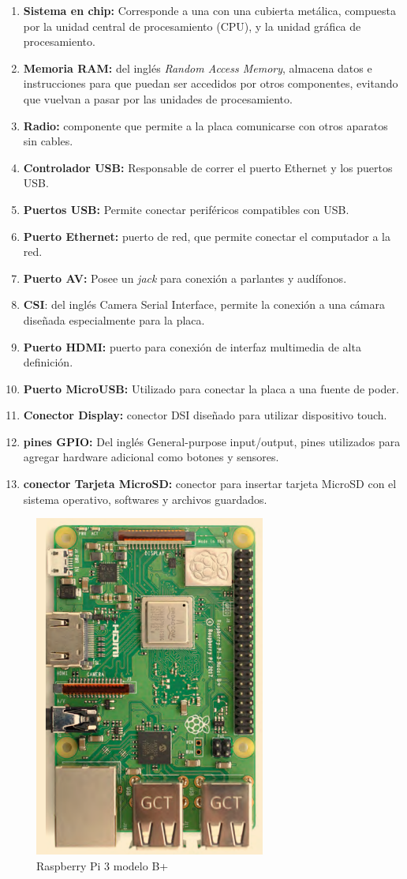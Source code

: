 \begin{enumerate}
\item \textbf{Sistema en chip:} Corresponde a una  con una cubierta metálica, compuesta por la unidad central de procesamiento (CPU), y la unidad gráfica de procesamiento.
\item \textbf{Memoria RAM:} del inglés \textit{Random Access Memory}, almacena datos e instrucciones para que puedan ser accedidos por otros componentes, evitando que vuelvan a pasar por las unidades de procesamiento.
\item \textbf{Radio:} componente que permite a la placa comunicarse con otros aparatos sin cables.
\item \textbf{Controlador USB:} Responsable de correr el puerto Ethernet y los puertos USB.
\item \textbf{Puertos USB:} Permite conectar periféricos compatibles con USB.
\item \textbf{Puerto Ethernet:} puerto de red, que permite conectar el computador a la red.
\item \textbf{Puerto AV:} Posee un \textit{jack} para conexión a parlantes y audífonos.
\item \textbf{CSI}: del inglés Camera Serial Interface, permite la conexión a una cámara diseñada especialmente para la placa.
\item \textbf{Puerto HDMI:} puerto para conexión de interfaz multimedia de alta definición.
\item \textbf{Puerto MicroUSB:} Utilizado para conectar la placa a una fuente de poder.
\item \textbf{Conector Display:} conector DSI diseñado para utilizar dispositivo touch.
\item \textbf{pines GPIO:} Del inglés General-purpose input/output, pines utilizados para agregar hardware adicional como botones y sensores.
\item \textbf{conector Tarjeta MicroSD:} conector para insertar tarjeta MicroSD con el sistema operativo, softwares y archivos guardados.


\end{enumerate}



\begin{figure}
\centering
\includegraphics[scale=0.9]{images/rbpi.png}
\caption{Raspberry Pi 3 modelo B+ \citep{gareth2018}}
\end{figure}
 





